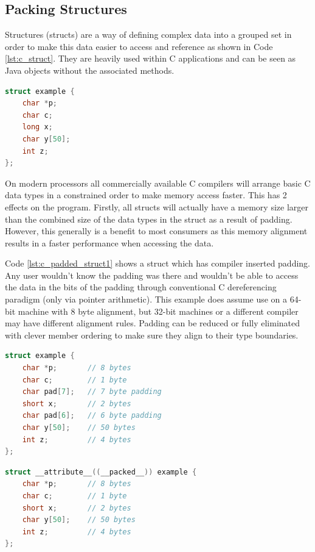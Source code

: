 \documentclass[final_report.tex]{subfiles}
\begin{document}
\subsection{Packing Structures}
\label{sec:packing}
Structures (structs) are a way of defining complex data into a grouped set in order to make this data easier to access and reference as shown in Code \ref{lst:c_struct}. They are heavily used within C applications and can be seen as Java objects without the associated methods.

\begin{lstlisting}[language=C, caption={Example C Struct}, label=lst:c_struct]
struct example {
    char *p;
    char c;
    long x;
    char y[50];
    int z;
};
\end{lstlisting}

On modern processors all commercially available C compilers will arrange basic C data types in a constrained order to make memory access faster. This has 2 effects on the program. Firstly, all structs will actually have a memory size larger than the combined size of the data types in the struct as a result of padding. However, this generally is a benefit to most consumers as this memory alignment results in a faster performance when accessing the data.

Code \ref{lst:c_padded_struct1} shows a struct which has compiler inserted padding. Any user wouldn't know the padding was there and wouldn't be able to access the data in the bits of the padding through conventional C dereferencing paradigm (only via pointer arithmetic). This example does assume use on a 64-bit machine with 8 byte alignment, but 32-bit machines or a different compiler may have different alignment rules. Padding can be reduced or fully eliminated with clever member ordering to make sure they align to their type boundaries.

\begin{lstlisting}[language=C, caption={Example C Struct \cite{catb} with compiler inserted padding on 64 bit machine}, label=lst:c_padded_struct1]
struct example {
    char *p;       // 8 bytes
    char c;        // 1 byte
    char pad[7];   // 7 byte padding
    short x;       // 2 bytes
    char pad[6];   // 6 byte padding
    char y[50];    // 50 bytes
    int z;         // 4 bytes
};
\end{lstlisting}

\begin{lstlisting}[language=C, caption={Example C Struct stopping padding}, label=lst:c_packed_struct]
struct __attribute__((__packed__)) example {
    char *p;       // 8 bytes
    char c;        // 1 byte
    short x;       // 2 bytes
    char y[50];    // 50 bytes
    int z;         // 4 bytes
};
\end{lstlisting}
\end{document}
